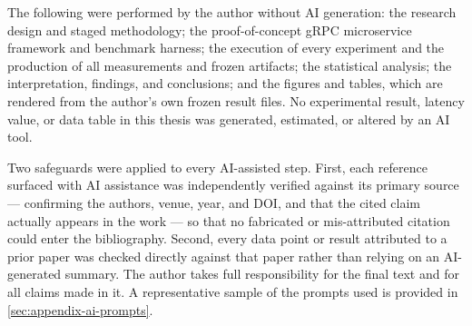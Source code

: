 The following were performed by the author without AI generation: the research design
and staged methodology; the proof-of-concept gRPC microservice framework and benchmark
harness; the execution of every experiment and the production of all measurements and
frozen artifacts; the statistical analysis; the interpretation, findings, and
conclusions; and the figures and tables, which are rendered from the author's own frozen
result files. No experimental result, latency value, or data table in this thesis was
generated, estimated, or altered by an AI tool.

Two safeguards were applied to every AI-assisted step. First, each reference surfaced
with AI assistance was independently verified against its primary source --- confirming
the authors, venue, year, and DOI, and that the cited claim actually appears in the work
--- so that no fabricated or mis-attributed citation could enter the bibliography.
Second, every data point or result attributed to a prior paper was checked directly
against that paper rather than relying on an AI-generated summary. The author takes full
responsibility for the final text and for all claims made in it. A representative sample
of the prompts used is provided in \cref{sec:appendix-ai-prompts}.
